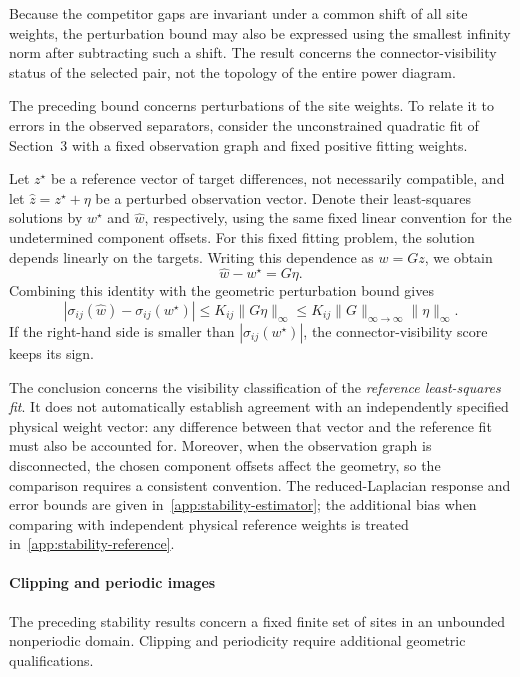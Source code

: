 Because the competitor gaps are invariant under a common shift of all site weights, the perturbation bound may also be expressed using the smallest infinity norm after subtracting such a shift. The result concerns the connector-visibility status of the selected pair, not the topology of the entire power diagram.

The preceding bound concerns perturbations of the site weights. To relate it to errors in the observed separators, consider the unconstrained quadratic fit of Section~3 with a fixed observation graph and fixed positive fitting weights.

Let $z^\star$ be a reference vector of target differences, not necessarily compatible, and let $\widehat z=z^\star+\eta$ be a perturbed observation vector. Denote their least-squares solutions by $w^\star$ and $\widehat w$, respectively, using the same fixed linear convention for the undetermined component offsets. For this fixed fitting problem, the solution depends linearly on the targets. Writing this dependence as $w=Gz$, we obtain
\begin{equation}
\widehat w-w^\star=G\eta.
\label{eq:weight-response}
\end{equation}
Combining this identity with the geometric perturbation bound gives
\begin{equation}
\boxed{
|\sigma_{ij}(\widehat w)-\sigma_{ij}(w^\star)|
\le K_{ij}\|G\eta\|_\infty
\le K_{ij}\|G\|_{\infty\to\infty}\|\eta\|_\infty.
}
\label{eq:observation-to-visibility}
\end{equation}
If the right-hand side is smaller than $|\sigma_{ij}(w^\star)|$, the connector-visibility score keeps its sign.

The conclusion concerns the visibility classification of the \emph{reference least-squares fit}. It does not automatically establish agreement with an independently specified physical weight vector: any difference between that vector and the reference fit must also be accounted for. Moreover, when the observation graph is disconnected, the chosen component offsets affect the geometry, so the comparison requires a consistent convention. The reduced-Laplacian response and error bounds are given in~\ref{app:stability-estimator}; the additional bias when comparing with independent physical reference weights is treated in~\ref{app:stability-reference}.

\paragraph{Clipping and periodic images}
The preceding stability results concern a fixed finite set of sites in an unbounded nonperiodic domain. Clipping and periodicity require additional geometric qualifications.

